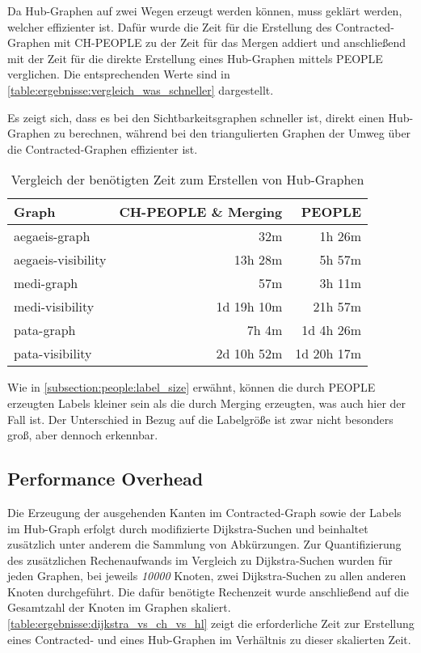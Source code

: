 Da Hub-Graphen auf zwei Wegen erzeugt werden können, muss geklärt werden, welcher effizienter ist.
Dafür wurde die Zeit für die Erstellung des Contracted-Graphen mit CH-PEOPLE zu der Zeit für das Mergen addiert und anschließend mit der Zeit für die direkte Erstellung eines Hub-Graphen mittels PEOPLE verglichen.
Die entsprechenden Werte sind in \autoref{table:ergebnisse:vergleich_was_schneller} dargestellt.

Es zeigt sich, dass es bei den Sichtbarkeitsgraphen schneller ist, direkt einen Hub-Graphen zu berechnen, während bei den triangulierten Graphen der Umweg über die Contracted-Graphen effizienter ist.

\begin{table}[h!]
  \centering
  \begin{tabular}{ %
      l %
      r
      r
    }
    \toprule
    {Graph}            & {CH-PEOPLE \& Merging} & {PEOPLE}             \\
    \midrule
    aegaeis-graph      & \B 32m                 & 1h 26m               \\
    aegaeis-visibility & 13h 28m                & \B 5h 57m            \\
    medi-graph         & \B 57m                 & 3h 11m               \\
    medi-visibility    & 1d 19h 10m             & \B 21h 57m           \\
    pata-graph         & \B 7h \phantom{0}4m    & 1d \phantom{0}4h 26m \\
    pata-visibility    & 2d 10h 52m             & \B 1d 20h 17m        \\  \bottomrule
  \end{tabular}
  \caption{Vergleich der benötigten Zeit zum Erstellen von Hub-Graphen}
  \label{table:ergebnisse:vergleich_was_schneller}
\end{table}

Wie in \autoref{subsection:people:label_size} erwähnt, können die durch PEOPLE erzeugten Labels kleiner sein als die durch Merging erzeugten, was auch hier der Fall ist.
Der Unterschied in Bezug auf die Labelgröße ist zwar nicht besonders groß, aber dennoch erkennbar.

\subsection{Performance Overhead}

Die Erzeugung der ausgehenden Kanten im Contracted-Graph sowie der Labels im Hub-Graph erfolgt durch modifizierte Dijkstra-Suchen und beinhaltet zusätzlich unter anderem die Sammlung von Abkürzungen.
Zur Quantifizierung des zusätzlichen Rechenaufwands im Vergleich zu Dijkstra-Suchen wurden für jeden Graphen, bei jeweils \emph{10000} Knoten, zwei Dijkstra-Suchen zu allen anderen Knoten durchgeführt.
Die dafür benötigte Rechenzeit wurde anschließend auf die Gesamtzahl der Knoten im Graphen skaliert.
\autoref{table:ergebnisse:dijkstra_vs_ch_vs_hl} zeigt die erforderliche Zeit zur Erstellung eines Contracted- und eines Hub-Graphen im Verhältnis zu dieser skalierten Zeit.

